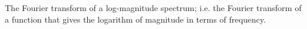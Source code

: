 The Fourier transform of a log-magnitude spectrum; i.e. the Fourier transform
of a function that gives the logarithm of magnitude in terms of frequency.